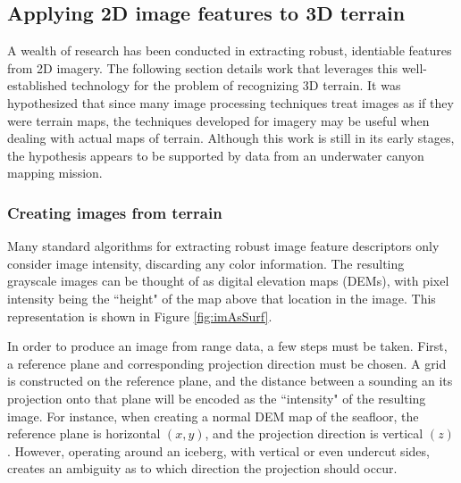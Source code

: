 \subsection{Applying 2D image features to 3D terrain}

A wealth of research has been conducted in extracting robust, identiable features from 2D imagery. The following section details work that leverages this well-established technology for the problem of recognizing 3D terrain. It was hypothesized that since many image processing techniques treat images as if they were terrain maps, the techniques developed for imagery may be useful when dealing with actual maps of terrain. Although this work is still in its early stages, the hypothesis appears to be supported by data from an underwater canyon mapping mission.

\subsubsection{Creating images from terrain}

Many standard algorithms for extracting robust image feature descriptors only consider image intensity, discarding any color information. The resulting grayscale images can be thought of as digital elevation maps (DEMs), with pixel intensity being the ``height" of the map above that location in the image. This representation is shown in Figure \ref{fig:imAsSurf}. 


In order to produce an image from range data, a few steps must be taken. First, a reference plane and corresponding projection direction must be chosen. A grid is constructed on the reference plane, and the distance between a sounding an its projection onto that plane will be encoded as the ``intensity" of the resulting image. For instance, when creating a normal DEM map of the seafloor, the reference plane is horizontal $(x,y)$, and the projection direction is vertical $(z)$. However, operating around an iceberg, with vertical or even undercut sides, creates an ambiguity as to which direction the projection should occur. 

